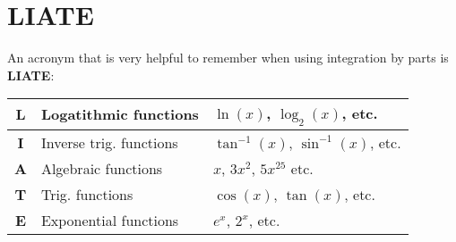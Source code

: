 \documentclass[12pt]{article}
\begin{document}
\section{LIATE}
An acronym that is very helpful to remember when using integration by parts is {\bf LIATE}:

\begin{center}
\begin{tabular}{ |c|l|l|}
\hline
  {\bf L} & Logatithmic functions  &  $\ln(x)$, $\log_2(x)$, etc. \\
\hline
  {\bf I} & Inverse trig. functions  &  $\tan^{-1}(x)$, $\sin^{-1}(x)$, etc. \\
\hline
  {\bf A} & Algebraic functions  &  $x$, $3x^2$, $5x^25$ etc. \\
\hline
  {\bf T} & Trig. functions  &  $\cos(x)$, $\tan(x)$, etc. \\
\hline
  {\bf E} & Exponential functions  &  $e^x$, $2^x$, etc. \\
\hline
\end{tabular}
\end{center}
\end{document}
